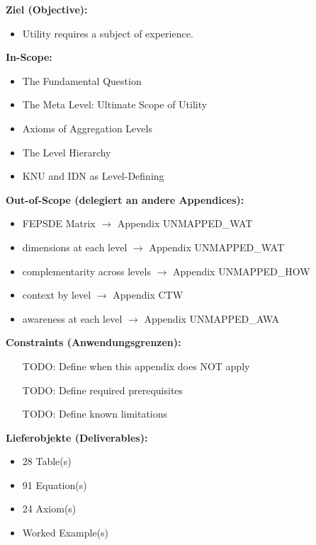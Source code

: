 \begin{tcolorbox}[
    colback=orange!5!white,
    colframe=orange!75!black,
    title={\textbf{Appendix Scope: Ziel / In-Scope / Out-of-Scope / Constraints}},
    fonttitle=\bfseries
]

\textbf{Ziel (Objective):}
\begin{itemize}[nosep]
    \item Utility requires a subject of experience.
\end{itemize}

\textbf{In-Scope:}
\begin{itemize}[nosep]
    \item The Fundamental Question
    \item The Meta Level: Ultimate Scope of Utility
    \item Axioms of Aggregation Levels
    \item The Level Hierarchy
    \item KNU and IDN as Level-Defining
\end{itemize}

\textbf{Out-of-Scope (delegiert an andere Appendices):}
\begin{itemize}[nosep]
    \item FEPSDE Matrix $\rightarrow$ Appendix UNMAPPED_WAT
    \item dimensions at each level $\rightarrow$ Appendix UNMAPPED_WAT
    \item complementarity across levels $\rightarrow$ Appendix UNMAPPED_HOW
    \item context by level $\rightarrow$ Appendix CTW
    \item awareness at each level $\rightarrow$ Appendix UNMAPPED_AWA
\end{itemize}

\textbf{Constraints (Anwendungsgrenzen):}
\begin{itemize}[nosep]
    \item [TODO: Define when this appendix does NOT apply]
    \item [TODO: Define required prerequisites]
    \item [TODO: Define known limitations]
\end{itemize}

\textbf{Lieferobjekte (Deliverables):}
\begin{itemize}[nosep]
    \item 28 Table(s)
    \item 91 Equation(s)
    \item 24 Axiom(s)
    \item Worked Example(s)
\end{itemize}

\end{tcolorbox}


